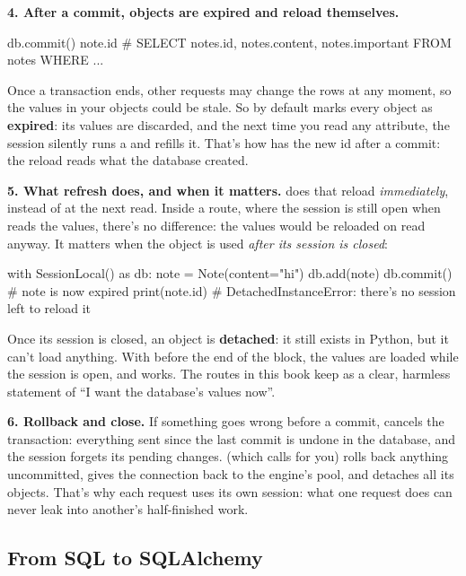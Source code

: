 \textbf{4. After a commit, objects are expired and reload themselves.}

\begin{py}
db.commit()
note.id             # SELECT notes.id, notes.content, notes.important FROM notes WHERE ...
\end{py}

Once a transaction ends, other requests may change the rows at any moment, so the values in your objects could be stale. So by default  marks every object as \textbf{expired}: its values are discarded, and the next time you read any attribute, the session silently runs a  and refills it. That's how  has the new id after a commit: the reload reads what the database created.

\textbf{5. What refresh does, and when it matters.}  does that reload \emph{immediately}, instead of at the next read. Inside a route, where the session is still open when  reads the values, there's no difference: the values would be reloaded on read anyway. It matters when the object is used \emph{after its session is closed}:

\begin{py}
with SessionLocal() as db:
	note = Note(content="hi")
	db.add(note)
	db.commit()        # note is now expired
print(note.id)         # DetachedInstanceError: there's no session left to reload it
\end{py}

Once its session is closed, an object is \textbf{detached}: it still exists in Python, but it can't load anything. With  before the end of the  block, the values are loaded while the session is open, and  works. The routes in this book keep  as a clear, harmless statement of ``I want the database's values now''.

\textbf{6. Rollback and close.} If something goes wrong before a commit,  cancels the transaction: everything sent since the last commit is undone in the database, and the session forgets its pending changes.  (which  calls for you) rolls back anything uncommitted, gives the connection back to the engine's pool, and detaches all its objects. That's why each request uses its own session: what one request does can never leak into another's half-finished work.

\subsection{From SQL to SQLAlchemy}

